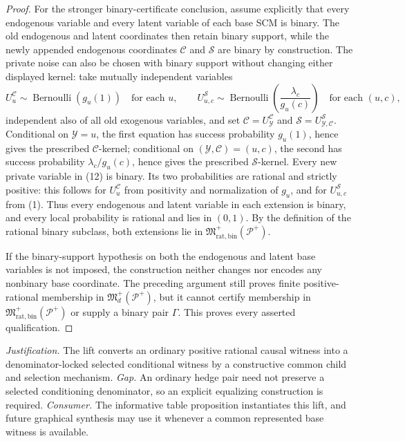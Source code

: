 \documentclass{article}
\begin{document}
\begin{proof}
For the stronger binary-certificate conclusion, assume explicitly that every endogenous variable and every latent variable of each base SCM is binary. The old endogenous and latent coordinates then retain binary support, while the newly appended endogenous coordinates \(\mathcal C\) and \(\mathcal S\) are binary by construction. The private noise can also be chosen with binary support without changing either displayed kernel: take mutually independent variables
\[
 U^{\mathcal C}_u\sim\operatorname{Bernoulli}(g_u(1))
 \quad\text{for each }u,
 \qquad
 U^{\mathcal S}_{u,c}\sim
 \operatorname{Bernoulli}\!\left(\frac{\lambda_c}{g_u(c)}\right)
 \quad\text{for each }(u,c),                              \tag{12}
\]
independent also of all old exogenous variables, and set \(\mathcal C=U^{\mathcal C}_{\mathcal Y}\) and \(\mathcal S=U^{\mathcal S}_{\mathcal Y,\mathcal C}\). Conditional on \(\mathcal Y=u\), the first equation has success probability \(g_u(1)\), hence gives the prescribed \(\mathcal C\)-kernel; conditional on \((\mathcal Y,\mathcal C)=(u,c)\), the second has success probability \(\lambda_c/g_u(c)\), hence gives the prescribed \(\mathcal S\)-kernel. Every new private variable in (12) is binary. Its two probabilities are rational and strictly positive: this follows for \(U^{\mathcal C}_u\) from positivity and normalization of \(g_u\), and for \(U^{\mathcal S}_{u,c}\) from (1). Thus every endogenous and latent variable in each extension is binary, and every local probability is rational and lies in \((0,1)\). By the definition of the rational binary subclass, both extensions lie in \(\mathfrak M_{\mathrm{rat,bin}}^+(\mathcal P^+)\).

If the binary-support hypothesis on both the endogenous and latent base variables is not imposed, the construction neither changes nor encodes any nonbinary base coordinate. The preceding argument still proves finite positive-rational membership in \(\mathfrak M_d^+(\mathcal P^+)\), but it cannot certify membership in \(\mathfrak M_{\mathrm{rat,bin}}^+(\mathcal P^+)\) or supply a binary pair \(\Gamma\). This proves every asserted qualification.
\end{proof}
\par\smallskip\noindent \textit{Justification.} The lift converts an ordinary positive rational causal witness into a denominator-locked selected conditional witness by a constructive common child and selection mechanism. \textit{Gap.} An ordinary hedge pair need not preserve a selected conditioning denominator, so an explicit equalizing construction is required. \textit{Consumer.} The informative table proposition instantiates this lift, and future graphical synthesis may use it whenever a common represented base witness is available.
\end{document}
